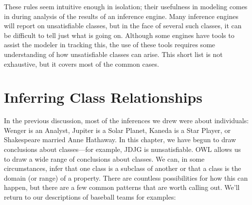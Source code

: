 These rules seem intuitive enough in isolation; their usefulness in
modeling comes in during analysis of
the results of an inference engine. Many inference engines will report
on unsatisfiable classes, but in the face of several such classes, it
can be difficult to tell just what is going on. Although some engines
have tools to assist the modeler in tracking this, the use of these
tools requires some understanding of how unsatisfiable classes can
arise. This short list is not exhaustive, but it covers most of the
common cases.

\section{Inferring Class Relationships}

In the previous discussion, most of the inferences we drew were about
individuals: Wenger is an Analyst, Jupiter is a Solar Planet, Kaneda is
a Star Player, or Shakespeare married Anne Hathaway. In this chapter, we
have begun to draw conclusions about classes---for example, JDJG is
nunsatisfiable. OWL allows us to draw a wide range of conclusions about
classes. We can, in some circumstances, infer that one class is a
subclass of another or that a class is the domain (or range) of a
property. There are countless possibilities for how this can happen, but
there are a few common patterns that are worth calling out. We'll return
to our descriptions of baseball teams for examples:

